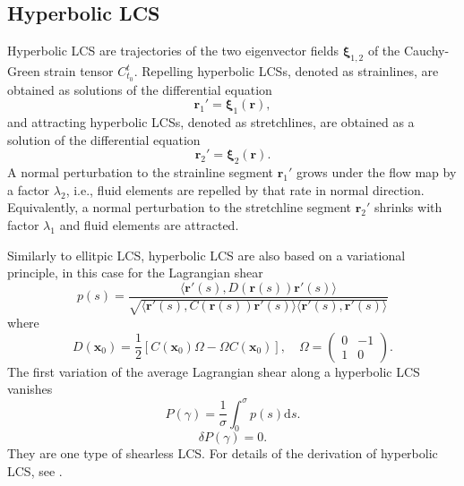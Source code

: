 \documentclass{article}
\begin{document}
\subsection{Hyperbolic LCS}
Hyperbolic LCS are trajectories of the two eigenvector fields $\boldsymbol \xi_{1,2}$ of the Cauchy-Green strain tensor $C_{t_0}^t$. Repelling hyperbolic LCSs, denoted as strainlines, are obtained as solutions of the differential equation
\[
\boldsymbol r_1' = \boldsymbol \xi_1(\boldsymbol r),
\]
and attracting hyperbolic LCSs, denoted as stretchlines, are obtained as a solution of the differential equation
\[
\boldsymbol r_2' = \boldsymbol \xi_2(\boldsymbol r).
\]
A normal perturbation to the strainline segment $\boldsymbol r_1'$ grows under the flow map by a factor $\lambda_2$, i.e., fluid elements are repelled by that rate in normal direction. Equivalently, a normal perturbation to the stretchline segment $\boldsymbol r_2'$ shrinks with factor $\lambda_1$ and fluid elements are attracted.

Similarly to ellitpic LCS, hyperbolic LCS are also based on a variational principle, in this case for the Lagrangian shear
\[
p(s) = \frac{\langle \boldsymbol r'(s), D(\boldsymbol r(s)) \boldsymbol r'(s)\rangle}{\sqrt{\langle \boldsymbol r'(s), C(\boldsymbol r(s)) \boldsymbol r'(s)\rangle \langle \boldsymbol r'(s), \boldsymbol r'(s)\rangle}}
\]
where
\[
D(\boldsymbol x_0) = \frac12[C(\boldsymbol x_0) \Omega - \Omega C(\boldsymbol x_0)], \quad \Omega = \begin{pmatrix}0&-1\\1&0\end{pmatrix}.
\]
The first variation of the average Lagrangian shear along a hyperbolic LCS vanishes
\[
P(\gamma) = \frac{1}{\sigma} \int_0^\sigma p(s) \text{d}s.
\]
\[
\delta P(\gamma) = 0.
\]
They are one type of shearless LCS. For details of the derivation of hyperbolic LCS, see \cite{farazmand13:_shearless}.
\end{document}
